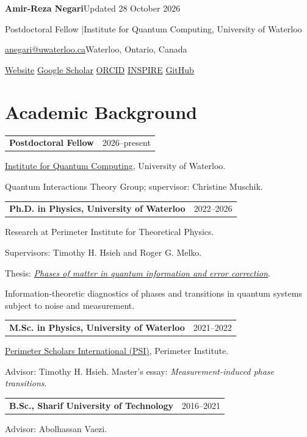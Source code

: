 \documentclass[10pt,letterpaper]{article}
\makeatletter
\newcommand{\dated}[2]{\par\begin{tabularx}{\linewidth}{@{}>{\raggedright\arraybackslash}X@{\hspace{12pt}}r@{}}#1 & \textcolor{muted}{#2}\\\end{tabularx}\par}
\newcommand{\entry}[3]{\needspace{46pt}\dated{\textbf{#1}}{#2}#3\par\vspace{3pt}}
\makeatother
\begin{document}
{\fontsize{27}{30}\selectfont\bfseries\color{link}Amir-Reza Negari}\hfill{\footnotesize\color{muted}Updated 28 October 2026}\par
\vspace{4pt}
Postdoctoral Fellow \enspace|\enspace Institute for Quantum Computing, University of Waterloo\par
\vspace{3pt}
\href{mailto:anegari@uwaterloo.ca}{anegari@uwaterloo.ca}\enspace\textbullet\enspace Waterloo, Ontario, Canada\par
\href{https://amirreza-negari.github.io/}{Website}\enspace\textbullet\enspace
\href{https://scholar.google.com/citations?user=_kyHGUcAAAAJ&hl=en}{Google Scholar}\enspace\textbullet\enspace
\href{https://orcid.org/0009-0007-1292-7187}{ORCID}\enspace\textbullet\enspace
\href{https://inspirehep.net/authors/2851625}{INSPIRE}\enspace\textbullet\enspace
\href{https://github.com/Amirreza-negari}{GitHub}

\section{Academic Background}
\entry{Postdoctoral Fellow}{2026--present}{
\href{https://uwaterloo.ca/institute-for-quantum-computing/contacts/amirreza-negari-0}{Institute for Quantum Computing}, University of Waterloo.\par
Quantum Interactions Theory Group; supervisor: Christine Muschik.}
\entry{Ph.D. in Physics, University of Waterloo}{2022--2026}{
Research at Perimeter Institute for Theoretical Physics.\par
Supervisors: Timothy H. Hsieh and Roger G. Melko.\par
Thesis: \href{https://hdl.handle.net/10012/23637}{\textit{Phases of matter in quantum information and error correction}}.\par
Information-theoretic diagnostics of phases and transitions in quantum systems subject to noise and measurement.}
\entry{M.Sc. in Physics, University of Waterloo}{2021--2022}{
\href{https://perimeterinstitute.ca/training/masters-program}{Perimeter Scholars International (PSI)}, Perimeter Institute.\par
Advisor: Timothy H. Hsieh. Master's essay: \textit{Measurement-induced phase transitions}.}
\entry{B.Sc., Sharif University of Technology}{2016--2021}{
Advisor: Abolhassan Vaezi.}
\end{document}
